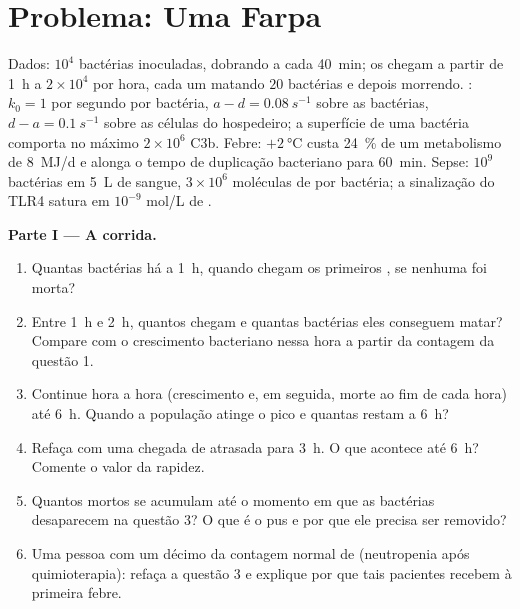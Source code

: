 \section{Problema: Uma Farpa}

\begin{problem}
\label{pb:b3:innate-immunity:1}
Dados: $10^{4}$ bactérias inoculadas, dobrando a cada \qty{40}{min}; os
 chegam a partir de \qty{1}{h} a $2\times 10^{4}$ por hora,
cada um matando $20$ bactérias e depois morrendo. : $k_{0} = 1$ por segundo por bactéria, $a - d = \qty{0.08}{s^{-1}}$ sobre as
bactérias, $d - a =
\qty{0.1}{s^{-1}}$ sobre as células do hospedeiro;
a superfície de uma bactéria comporta no máximo $2\times 10^{6}$ C3b.
Febre: $+\qty{2}{\celsius}$ custa \qty{24}{\%} de um metabolismo de
\qty{8}{MJ/d} e alonga o tempo de duplicação bacteriano para
\qty{60}{min}. Sepse: $10^{9}$ bactérias em \qty{5}{L} de sangue,
$3\times 10^{6}$ moléculas de  por bactéria; a
sinalização do TLR4 satura em $10^{-9}$ mol/L de .

\medskip
\noindent\textbf{Parte I --- A corrida.}
\begin{enumerate}
  \item Quantas bactérias há a \qty{1}{h}, quando chegam os primeiros
        , se nenhuma foi morta?
  \item Entre \qty{1}{h} e \qty{2}{h}, quantos  chegam e
        quantas bactérias eles conseguem matar? Compare com o
        crescimento bacteriano nessa hora a partir da contagem da
        questão 1.
  \item Continue hora a hora (crescimento e, em seguida, morte ao fim de
        cada hora) até \qty{6}{h}. Quando a população atinge o pico e
        quantas restam a \qty{6}{h}?
  \item Refaça com uma chegada de  atrasada para \qty{3}{h}.
        O que acontece até \qty{6}{h}? Comente o valor da rapidez.
  \item Quantos  mortos se acumulam até o momento em que as
        bactérias desaparecem na questão 3? O que é o pus e por que ele
        precisa ser removido?
  \item Uma pessoa com um décimo da contagem normal de 
        (neutropenia após quimioterapia): refaça a questão 3 e explique
        por que tais pacientes recebem  à primeira febre.
\end{enumerate}


\end{problem}
